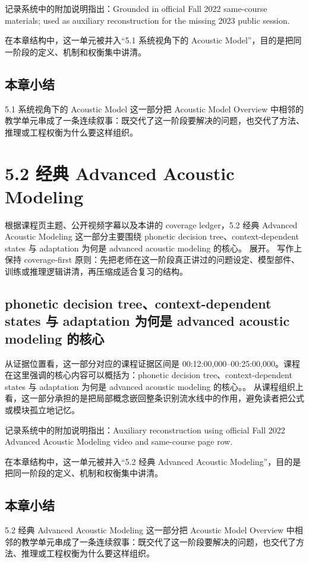 \documentclass[a4paper]{article}
\begin{document}
记录系统中的附加说明指出：Grounded in official Fall 2022 same-course materials; used as auxiliary reconstruction for the missing 2023 public session.

在本章结构中，这一单元被并入“5.1 系统视角下的 Acoustic Model”，目的是把同一阶段的定义、机制和权衡集中讲清。

\subsection{本章小结}
5.1 系统视角下的 Acoustic Model 这一部分把 Acoustic Model Overview 中相邻的教学单元串成了一条连续叙事：既交代了这一阶段要解决的问题，也交代了方法、推理或工程权衡为什么要这样组织。

\section{5.2 经典 Advanced Acoustic Modeling}
根据课程页主题、公开视频字幕以及本讲的 coverage ledger，5.2 经典 Advanced Acoustic Modeling 这一部分主要围绕 phonetic decision tree、context-dependent states 与 adaptation 为何是 advanced acoustic modeling 的核心。 展开。
写作上保持 coverage-first 原则：先把老师在这一阶段真正讲过的问题设定、模型部件、训练或推理逻辑讲清，再压缩成适合复习的结构。

\subsection{phonetic decision tree、context-dependent states 与 adaptation 为何是 advanced acoustic modeling 的核心}
从证据位置看，这一部分对应的课程证据区间是 00:12:00,000--00:25:00,000。课程在这里强调的核心内容可以概括为：phonetic decision tree、context-dependent states 与 adaptation 为何是 advanced acoustic modeling 的核心。。
从课程组织上看，这一部分承担的是把局部概念嵌回整条识别流水线中的作用，避免读者把公式或模块孤立地记忆。

记录系统中的附加说明指出：Auxiliary reconstruction using official Fall 2022 Advanced Acoustic Modeling video and same-course page row.

在本章结构中，这一单元被并入“5.2 经典 Advanced Acoustic Modeling”，目的是把同一阶段的定义、机制和权衡集中讲清。

\subsection{本章小结}
5.2 经典 Advanced Acoustic Modeling 这一部分把 Acoustic Model Overview 中相邻的教学单元串成了一条连续叙事：既交代了这一阶段要解决的问题，也交代了方法、推理或工程权衡为什么要这样组织。
\end{document}
